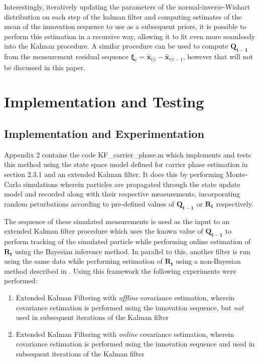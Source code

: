 \documentclass[11pt]{article}
\begin{document}
\noindent Interestingly, iteratively updating the parameters of the normal-inverse-Wishart distribution on each step of the kalman filter and computing estimates of the mean of the innovation sequence to use as a subsequent priors, it is possible to perform this estimation in a recursive way, allowing it to fit even more seamlessly into the Kalman procedure. A similar procedure can be used to compute $\mathbf{Q_{t-1}}$ from the measurement residual sequence $\bm{\xi}_t = \hat{\mathbf{x}}_{t|t} - \hat{\mathbf{x}}_{t|t-1}$, however that will not be discussed in this paper.

\section{Implementation and Testing}

\subsection{Implementation and Experimentation}

Appendix 2 contains the code KF\_carrier\_phase.m which implements and tests this method using the state space model defined for carrier phase estimation in section 2.3.1 and an extended Kalman filter. It does this by performing Monte-Carlo simulations wherein particles are propagated through the state update model and recorded along with their respective measurements, incorporating random peturbations according to pre-defined values of $\mathbf{Q_{t-1}}$ or $\mathbf{R_{t}}$ respectively.

The sequence of these simulated measurements is used as the input to an extended Kalman filter procedure which uses the known value of $\mathbf{Q_{t-1}}$ to perform tracking of the simulated particle while performing online estimation of $\mathbf{R_{t}}$ using the Bayesian inference method. In parallel to this, another filter is run using the same data while performing estimation of $\mathbf{R_{t}}$ using a non-Bayesian method described in \cite{Myer-76}. Using this framework the following experiments were performed:

\begin{enumerate}
    \item Extended Kalman Filtering with \textit{offline} covariance estimation, wherein covariance estimation is performed using the innovation sequence, but \textit{not} used in subsequent iterations of the Kalman filter
    \item Extended Kalman Filtering with \textit{online} covariance estimation, wherein covariance estimation is performed using the innovation sequence and used in subsequent iterations of the Kalman filter
\end{enumerate}
\end{document}
